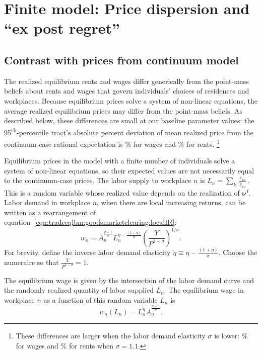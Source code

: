 \documentclass[11pt]{article}
\theoremstyle{definition}
\begin{document}
\section{Finite model: Price dispersion and ``ex post regret''}\label{sec:appendix:expostregret}

\subsection{Contrast with prices from continuum model}\label{sec:appendix:expostregret:Jenseninequality}

The realized equilibrium rents and wages differ generically
from the point-mass beliefs about rents and wages
that govern individuals' choices of residences and workplaces.
Because equilibrium prices solve a system of non-linear equations,
the average realized equilibrium prices may differ from the point-mass beliefs.
As described below,
these differences are small at our baseline parameter values:
the 95\textsuperscript{th}-percentile tract's absolute percent deviation of mean realized price from the continuum-case rational expectation is
\%
for wages and
\%
for rents.%
\footnote{These differences are larger when the labor demand elasticity $\sigma$ is lower:
	\%
	for wages and
	\%
	for rents
	when $\sigma = 1.1$.
}

Equilibrium prices in the model with a finite number of individuals
solve a system of non-linear equations,
so their expected values are not necessarily equal to the continuum-case prices.
The labor supply to workplace $n$ is $L_n = \sum_{k} \frac{\ell_{kn}}{\bar{\delta}_{kn}}$.
This is a random variable whose realized value depends on the realization of $\boldsymbol \nu^{I}$.
Labor demand in workplace $n$, when there are local increasing returns, can be written as a rearrangement of equation~\eqref{eqn:tradeeqlbm:goodsmarketclearing:localIR}:
\begin{equation*}
w_n= \bar{A}_{n}^{\frac{\sigma-1}{\sigma}} L_{n}^{\eta-\frac{(1+\eta)}{\sigma}}    \left( \frac{Y}{P^{1-\sigma}} \right)^{1/\sigma}
.\end{equation*}
For brevity, define the inverse labor demand elasticity $\tilde{\eta} \equiv \eta-\frac{(1+\eta)}{\sigma}$.
Choose the numeraire so that $\frac{Y}{P^{1-\sigma}} = 1$.

The equilibrium wage is given by the intersection of the labor demand curve and the randomly realized quantity of labor supplied $L_n$.
The equilibrium wage in workplace $n$ as a function of this random variable $L_n$ is
\begin{equation*}
w_{n}\left(L_n\right)
=
L_{n}^{\tilde{\eta}}
\bar{A}_{n}^{\frac{\sigma-1}{\sigma}} 
.\end{equation*}
\end{document}
